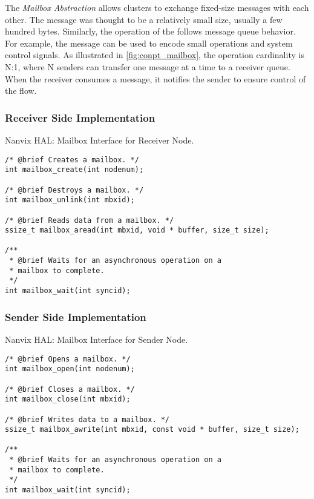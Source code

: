 
			The \textit{Mailbox Abstraction} allows clusters to exchange fixed-size
			messages with each other.
			The message was thought to be a relatively small size, usually a few hundred bytes.
			Similarly, the operation of the \mailbox follows \posix message queue behavior.
			For example, the message can be used to encode small operations and system
			control signals.
			As illustrated in \autoref{fig:conpt_mailbox}, the operation cardinality is N:1,
			where N senders can transfer one message at a time to a receiver queue.
			When the receiver consumes a message, it notifies the sender to ensure
			control of the flow.

			\subsubsection{Receiver Side Implementation}

\begin{listing}[!tb]
\caption{Nanvix HAL: Mailbox Interface for Receiver Node.}
\label{code:hal-mailbox-receiver}
\begin{verbatim}
/* @brief Creates a mailbox. */
int mailbox_create(int nodenum);

/* @brief Destroys a mailbox. */
int mailbox_unlink(int mbxid);

/* @brief Reads data from a mailbox. */
ssize_t mailbox_aread(int mbxid, void * buffer, size_t size);

/**
 * @brief Waits for an asynchronous operation on a
 * mailbox to complete.
 */
int mailbox_wait(int syncid);
\end{verbatim}
\end{listing}

			\subsubsection{Sender Side Implementation}

\begin{listing}[!tb]
\caption{Nanvix HAL: Mailbox Interface for Sender Node.}
\label{code:hal-mailbox-sender}
\begin{verbatim}
/* @brief Opens a mailbox. */
int mailbox_open(int nodenum);

/* @brief Closes a mailbox. */
int mailbox_close(int mbxid);

/* @brief Writes data to a mailbox. */
ssize_t mailbox_awrite(int mbxid, const void * buffer, size_t size);

/**
 * @brief Waits for an asynchronous operation on a
 * mailbox to complete.
 */
int mailbox_wait(int syncid);
\end{verbatim}
\end{listing}


